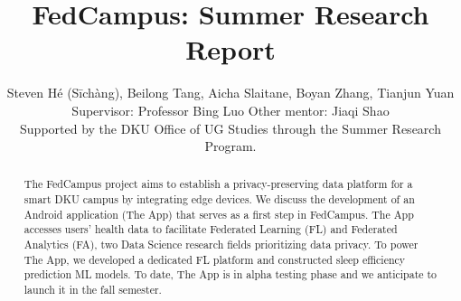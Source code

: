 \documentclass{article}
\title{FedCampus: Summer Research Report}
\author{
    Steven Hé (Sīchàng), Beilong Tang, Aicha Slaitane, Boyan Zhang,
    Tianjun Yuan\\
    Supervisor: Professor Bing Luo\quad
    Other mentor: Jiaqi Shao\\
    Supported by the DKU Office of UG Studies through the Summer Research
    Program.
}
\begin{document}
\maketitle

\begin{abstract}
The FedCampus project aims to establish a privacy-preserving data
platform for a smart DKU campus by integrating edge devices. We discuss
the development of an Android application (The App) that serves as a
first step in FedCampus. The App accesses users' health
data to facilitate Federated Learning (FL) and Federated Analytics (FA),
two Data Science research fields prioritizing data privacy. To power The
App, we developed a dedicated FL platform and constructed sleep
efficiency prediction ML models. To date, The App is in alpha testing
phase and we anticipate to launch it in the fall semester.
\end{abstract}
\end{document}
